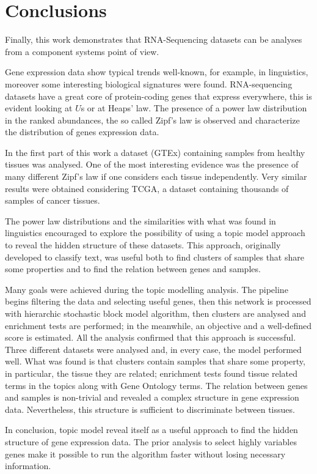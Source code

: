 \chapter{Conclusions}\label{ch:conclusions}
Finally, this work demonstrates that RNA-Sequencing datasets can be analyses from a component systems point of view.

Gene expression data show typical trends well-known, for example, in linguistics, moreover some interesting biological signatures were found. RNA-sequencing datasets have a great core of protein-coding genes that express everywhere, this is evident looking at $U$s or at Heaps' law. The presence of a power law distribution in the ranked abundances, the so called Zipf's law is observed and characterize the distribution of genes expression data.

In the first part of this work a dataset (GTEx) containing samples from healthy tissues was analysed. One of the most interesting evidence was the presence of many different Zipf's law if one considers each tissue independently. Very similar results were obtained considering TCGA, a dataset containing thousands of samples of cancer tissues.

The power law distributions and the similarities with what was found in linguistics encouraged to explore the possibility of using a topic model approach to reveal the hidden structure of these datasets. This approach, originally developed to classify text, was useful both to find clusters of samples that share some properties and to find the relation between genes and samples.

Many goals were achieved during the topic modelling analysis. The pipeline begins filtering the data and selecting useful genes, then this network is processed with hierarchic stochastic block model algorithm, then clusters are analysed and enrichment tests are performed; in the meanwhile, an objective and a well-defined score is estimated. All the analysis confirmed that this approach is successful. Three different datasets were analysed and, in every case, the model performed well. What was found is that clusters contain samples that share some property, in particular, the tissue they are related; enrichment tests found tissue related terms in the topics along with Gene Ontology terms. The relation between genes and samples is non-trivial and revealed a complex structure in gene expression data. Nevertheless, this structure is sufficient to discriminate between tissues.

In conclusion, topic model reveal itself as a useful approach to find the hidden structure of gene expression data. The prior analysis to select highly variables genes make it possible to run the algorithm faster without losing necessary information.

